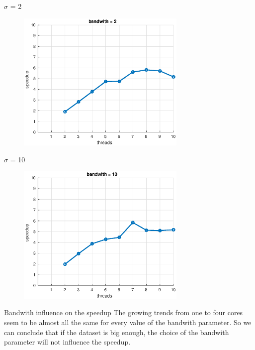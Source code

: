 \documentclass{beamer}
\begin{document}
\begin{frame}{$\sigma$ = 2}

\begin{figure}[H]
\centering
\includegraphics[width=3.2in]{../Paper/fig/speedup2b.eps}
\end{figure}

\end{frame}


\begin{frame}{$\sigma$ = 10}

\begin{figure}[H]
\centering
\includegraphics[width=3.2in]{../Paper/fig/speedup10b.eps}
\end{figure}

\end{frame}

\begin{frame}{Bandwith influence on the speedup}
The growing trends from one to four cores seem to be almost all the same for every value of the bandwith parameter. So we can conclude that if the dataset is big enough, the choice of the bandwith parameter will not influence the speedup.
\end{frame}
\end{document}
